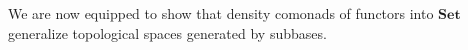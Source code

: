 \documentclass[11pt, oneside, article]{memoir}
\theoremstyle{plain}
\newtheorem{proposition}[theorem]{Proposition}
\theoremstyle{definition}
\theoremstyle{remark}
\newenvironment{remark}
{\renewcommand\qedsymbol{$\lrcorner$}%
  \pushQED{\qed}\myremark}
{\popQED\endmyremark}
\DeclareMathOperator{\Sh}{Sh}
\DeclareMathOperator{\Psh}{Psh}
\DeclarePairedDelimiter{\abs}{\lvert}{\rvert}
\newcommand{\namedcat}[1]{\mathbf{#1}}
\newcommand{\spa}[1]{\mathbf{#1}}
\newcommand{\Set}{\namedcat{Set}}
\newcommand{\CoalgOn}[2]{{#2}^{#1}}
\newcommand{\CoalgSet}[1]{\CoalgOn{#1}{\Set}}
\newcommand{\pts}[1]{{\abs{#1}}}
\newcommand{\lift}[1]{\widecheck{#1}}
\newcommand{\carr}{\Sigma}
\newcommand{\car}[1]{\carr^{#1}}
\newcommand{\ph}[1]{#1}
\newcommand{\topbasis}[1]{\pP_{#1}}
\newcommand{\pP}{\ph{P}}
\newcommand{\tX}{\spa{X}}
\newcommand{\cX}{\toptocmd{\tX}}
\newcommand{\toptocmd}[1]{{{#1}^\circ}}
\newcommand{\opens}[1]{\mathcal{O}(#1)}
\begin{document}





We are now equipped to show that density comonads of functors into
$\Set$ generalize topological spaces generated by subbases.
\end{document}
